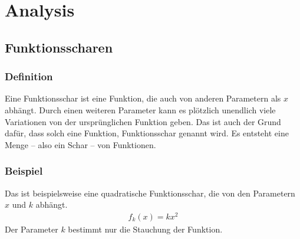 \chapter{Analysis}

\section{Funktionsscharen}
\subsection{Definition}
\begin{flushleft}
    Eine Funktionsschar ist eine Funktion, die auch von anderen Parametern als $x$ abhängt.
    Durch einen weiteren Parameter kann es plötzlich unendlich viele Variationen von der ursprünglichen Funktion geben.
    Das ist auch der Grund dafür, dass solch eine Funktion, Funktionsschar genannt wird.
    Es entsteht eine Menge -- also ein Schar -- von Funktionen.
\end{flushleft}

\subsection{Beispiel}
\begin{flushleft}
    Das ist beispielsweise eine quadratische Funktionsschar, die von den Parametern $x$ und $k$ abhängt.
    \begin{align}
        f_k(x)=kx^2
    \end{align}
    Der Parameter $k$ bestimmt nur die Stauchung der Funktion.
\end{flushleft}

\begin{center}
\end{center}


